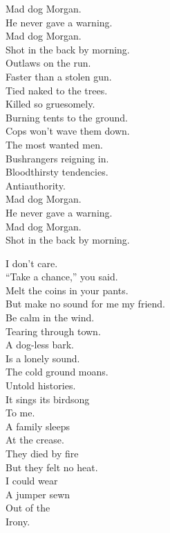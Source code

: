 Mad dog Morgan. \\
He never gave a warning. \\
Mad dog Morgan. \\
Shot in the back by morning. \\

Outlaws on the run. \\
Faster than a stolen gun. \\
Tied naked to the trees. \\
Killed so gruesomely. \\
Burning tents to the ground. \\
Cops won't wave them down. \\
The most wanted men. \\
Bushrangers reigning in. \\

Bloodthirsty tendencies. \\
Antiauthority. \\

Mad dog Morgan. \\
He never gave a warning. \\
Mad dog Morgan. \\
Shot in the back by morning. \\




I don't care. \\
``Take a chance,'' you said. \\
Melt the coins in your pants. \\
But make no sound for me my friend. \\

Be calm in the wind. \\
Tearing through town. \\
A dog-less bark. \\
Is a lonely sound. \\

The cold ground moans. \\
Untold histories. \\
It sings its birdsong \\
To me. \\

A family sleeps \\
At the crease. \\
They died by fire \\
But they felt no heat. \\
I could wear \\
A jumper sewn \\
Out of the \\
Irony. \\

